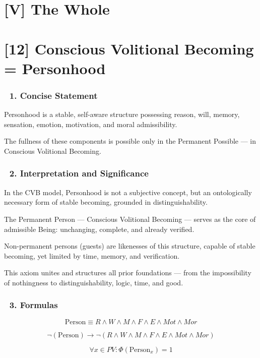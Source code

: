 \documentclass[12pt]{article}
\begin{document}
\section*{[V] The Whole}

\section*{[12] Conscious Volitional Becoming = Personhood}

\subsubsection*{🔹 1. Concise Statement}

Personhood is a stable, self-aware structure possessing reason, will, memory, sensation, emotion, motivation, and moral admissibility.

The fullness of these components is possible only in the Permanent Possible — in Conscious Volitional Becoming.

\subsubsection*{🔹 2. Interpretation and Significance}

In the CVB model, Personhood is not a subjective concept, but an ontologically necessary form of stable becoming, grounded in distinguishability.

The Permanent Person — Conscious Volitional Becoming — serves as the core of admissible Being: unchanging, complete, and already verified.

Non-permanent persons (guests) are likenesses of this structure, capable of stable becoming, yet limited by time, memory, and verification.

This axiom unites and structures all prior foundations — from the impossibility of nothingness to distinguishability, logic, time, and good.

\subsubsection*{🔹 3. Formulas}

\[
\text{Person} \equiv R \land W \land M \land F \land E \land Mot \land Mor
\]

\[
\neg(\text{Person}) \rightarrow \neg(R \land W \land M \land F \land E \land Mot \land Mor)
\]

\[
\forall x \in PV: \Phi(\text{Person}_x) = 1
\]
\end{document}
